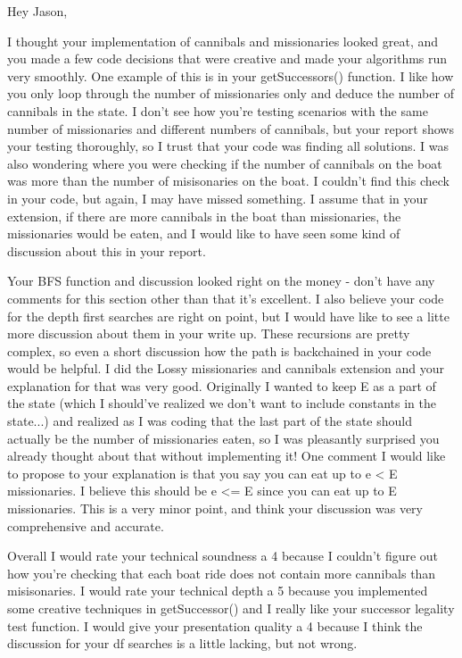 Hey Jason, 

I thought your implementation of cannibals and missionaries looked great, and you made a few code decisions that were creative and made your algorithms run very smoothly. One example of this is in your getSuccessors() function. I like how you only loop through the number of missionaries only and deduce the number of cannibals in the state. I don't see how you're testing scenarios with the same number of missionaries and different numbers of cannibals, but your report shows your testing thoroughly, so I trust that your code was finding all solutions. I was also wondering where you were checking if the number of cannibals on the boat was more than the number of misisonaries on the boat. I couldn't find this check in your code, but again, I may have missed something. I assume that in your extension, if there are more cannibals in the boat than missionaries, the missionaries would be eaten, and I would like to have seen some kind of discussion about this in your report. 

Your BFS function and discussion looked right on the money - don't have any comments for this section other than that it's excellent. I also believe your code for the depth first searches are right on point, but I would have like to see a litte more discussion about them in your write up. These recursions are pretty complex, so even a short discussion how the path is backchained in your code would be helpful. I did the Lossy missionaries and cannibals extension and your explanation for that was very good. Originally I wanted to keep E as a part of the state (which I should've realized we don't want to include constants in the state...) and realized as I was coding that the last part of the state should actually be the number of missionaries eaten, so I was pleasantly surprised you already thought about that without implementing it! One comment I would like to propose to your explanation is that you say you can eat up to e < E missionaries. I believe this should be e <= E since you can eat up to E missionaries. This is a very minor point, and think your discussion was very comprehensive and accurate. 

Overall I would rate your technical soundness a 4 because I couldn't figure out how you're checking that each boat ride does not contain more cannibals than misisonaries. I would rate your technical depth a 5 because you implemented some creative techniques in getSuccessor() and I really like your successor legality test function. I would give your presentation quality a 4 because I think the discussion for your df searches is a little lacking, but not wrong. 

